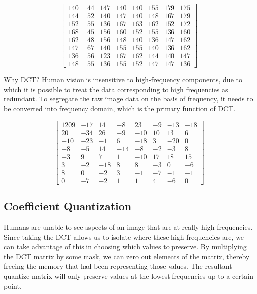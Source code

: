 \begin{equation}
    \begin{bmatrix}
        140 & 144 & 147 & 140 & 140 & 155 & 179 & 175\\ 
        144 & 152 & 140 & 147 & 140 & 148 & 167 & 179\\ 
        152 & 155 & 136 & 167 & 163 & 162 & 152 & 172\\ 
        168 & 145 & 156 & 160 & 152 & 155 & 136 & 160\\ 
        162 & 148 & 156 & 148 & 140 & 136 & 147 & 162\\ 
        147 & 167 & 140 & 155 & 155 & 140 & 136 & 162\\ 
        136 & 156 & 123 & 167 & 162 & 144 & 140 & 147\\ 
        148 & 155 & 136 & 155 & 152 & 147 & 147 & 136
    \end{bmatrix}
    \label{eq:8x8block}   
\end{equation}

Why DCT? Human vision is insensitive to high-frequency components, due to which it is possible to treat the data corresponding to high frequencies as redundant. To segregate the raw image data on the basis of frequency, it needs to be converted into frequency domain, which is the primary function of DCT.

\begin{equation}
    \begin{bmatrix}
        1209 & -17 & 14 & -8 & 23 & -9 & -13 & -18 \\
        20 & -34 & 26 & -9 & -10 & 10 & 13 & 6 \\
        -10 & -23 & -1 & 6 & -18 & 3 & -20 & 0 \\
        -8 & -5 & 14 & -14 & -8 & -2 & -3 & 8 \\
        -3 & 9 & 7 & 1 & -10 & 17 & 18 & 15 \\
        3 & -2 & -18 & 8 & 8 & -3 & 0 & -6 \\
        8 & 0 & -2 & 3 & -1 & -7 & -1 & -1 \\
        0 & -7 & -2 & 1 & 1 & 4 & -6 & 0
    \end{bmatrix}
    \label{eq:DCTTransform}
\end{equation}

\subsection{Coefficient Quantization}

Humans are unable to see aspects of an image that are at really high frequencies. Since taking the DCT allows us to isolate where these high frequencies are, we can take advantage of this in choosing which values to preserve. By multiplying the DCT matrix by some mask, we can zero out elements of the matrix, thereby freeing the memory that had been representing those values. The resultant quantize matrix will only preserve values at the lowest frequencies up to a certain point.

